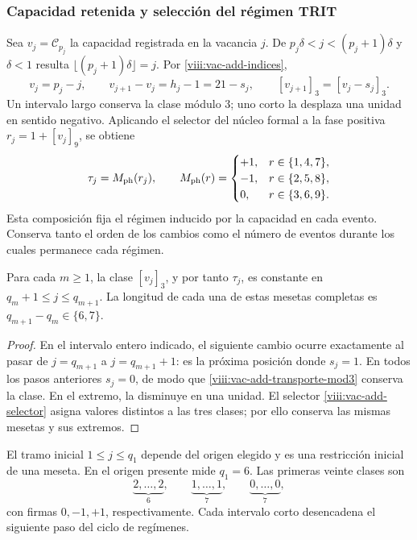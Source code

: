 \subsubsection{Capacidad retenida y selección del régimen TRIT}
\label{viii:vac-add-regimen}

Sea \(v_j=\mathcal C_{p_j}\) la capacidad registrada en la vacancia
\(j\). De \(p_j\delta<j<(p_j+1)\delta\) y \(\delta<1\) resulta
\(\lfloor(p_j+1)\delta\rfloor=j\). Por
\eqref{viii:vac-add-indices},
\begin{equation}
 v_j=p_j-j,
 \qquad v_{j+1}-v_j=h_j-1=21-s_j,
 \qquad [v_{j+1}]_3=[v_j-s_j]_3.
 \label{viii:vac-add-transporte-mod3}
\end{equation}
Un intervalo largo conserva la clase módulo \(3\); uno corto la
desplaza una unidad en sentido negativo. Aplicando el selector del
núcleo formal a la fase positiva \(r_j=1+[v_j]_9\), se obtiene
\begin{equation}
 \tau_j=M_{\rm ph}(r_j),\qquad
 M_{\rm ph}(r)=
 \begin{cases}
 +1,&r\in\{1,4,7\},\\
 -1,&r\in\{2,5,8\},\\
 0,&r\in\{3,6,9\}.
 \end{cases}
 \label{viii:vac-add-selector}
\end{equation}
Esta composición fija el régimen inducido por la capacidad en cada
evento. Conserva tanto el orden de los cambios como el número de
eventos durante los cuales permanece cada régimen.

\begin{corollary}
\label{viii:vac-add-mesetas}
Para cada \(m\geq1\), la clase \([v_j]_3\), y por tanto
\(\tau_j\), es constante en
\(q_m+1\leq j\leq q_{m+1}\). La longitud de cada una de estas
mesetas completas es \(q_{m+1}-q_m\in\{6,7\}\).
\end{corollary}
\begin{proof}
En el intervalo entero indicado, el siguiente cambio ocurre exactamente
al pasar de \(j=q_{m+1}\) a \(j=q_{m+1}+1\): es la próxima posición
donde \(s_j=1\). En todos los pasos anteriores \(s_j=0\), de modo
que \eqref{viii:vac-add-transporte-mod3} conserva la clase. En el extremo,
la disminuye en una unidad. El selector \eqref{viii:vac-add-selector}
asigna valores distintos a las tres clases; por ello conserva las
mismas mesetas y sus extremos.
\end{proof}

El tramo inicial \(1\leq j\leq q_1\) depende del origen elegido y
es una restricción inicial de una meseta. En el origen presente mide
\(q_1=6\). Las primeras veinte clases son
\[
 \underbrace{2,\ldots,2}_{6},\qquad
 \underbrace{1,\ldots,1}_{7},\qquad
 \underbrace{0,\ldots,0}_{7},
\]
con firmas \(0,-1,+1\), respectivamente. Cada intervalo corto
desencadena el siguiente paso del ciclo de regímenes.

